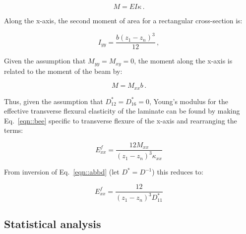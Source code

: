 \documentclass[twocolumn, linenumbers, superscriptaddress, nofootinbib]{revtex4-1}
\begin{document}
				\begin{equation}
				\label{eqn::bee}
				M = EI\kappa\,.
				\end{equation}
				
				Along the x-axis, the second moment of area for a rectangular cross-section is:
				
				\begin{equation}
					I_{yy} = \frac{b(z_1 - z_n)^3}{12}\,,
				\end{equation}	
				
				Given the assumption that $M_{yy} = M_{xy} = 0$, the moment along the x-axis is related to the moment of the beam by:
				
				\begin{equation}
					M = M_{xx}b\,.
				\end{equation}
				
				Thus, given the assumption that $D^*_{12} = D^*_{16} = 0$, Young's modulus for the effective transverse flexural elasticity of the laminate can be found by making Eq.~\ref{eqn::bee} specific to transverse flexure of the x-axis and rearranging the terms:
				
				\begin{equation}
					E^f_{xx} = \frac{12M_{xx}}{(z_1 - z_n)^3\kappa_{xx}}
				\end{equation}
				
				From inversion of Eq.~\ref{eqn::abbd} (let $D^* = D^{-1}$) this reduces to:
				
				\begin{equation}
					E^f_{xx} = \frac{12}{(z_1 - z_n)^3D^*_{11}}
				\end{equation}
					
		\subsection*{Statistical analysis}
\end{document}
